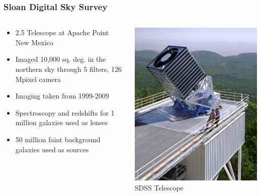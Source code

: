 \documentclass{beamer}
\begin{document}
\frame
{
    \frametitle{Sloan Digital Sky Survey}

    \begin{columns}
        \begin{column}{0.5\textwidth}    
            \begin{itemize}

                \item 2.5 Telescope at Apache Point New Mexico

                \item Imaged 10,000 sq. deg. in the northern sky through 5
                    filters, 126 Mpixel camera

                \item Imaging taken from 1999-2009

                \item Spectroscopy and redshifts for 1 million galaxies used
                    as {\color{gold} lenses }

                \item 50 million faint background galaxies used as {\color{gold} sources}
                    
            \end{itemize}
        \end{column}
        \begin{column}{0.5\textwidth}
            \begin{center}
                \includegraphics[width=\textwidth]{sdss-telescope.jpg}
                \newline
                {\tiny SDSS Telescope}
            \end{center}
        \end{column}
    \end{columns}
}
\end{document}
